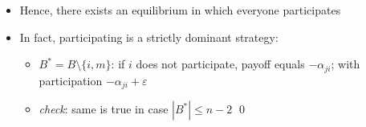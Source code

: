 \documentclass[11pt,english]{beamer}
\newcommand{\ve}{\varepsilon}
\begin{document}
\begin{frame}[allowframebreaks]
\begin{itemize}
\item Hence, there exists an equilibrium in which everyone participates\\
\label{sec-3-1-15}%
\item In fact, participating is a strictly dominant strategy:
\label{sec-3-1-16}%
\begin{itemize}

\item $B^{*}=B \setminus \{i,m\}$: if $i$ does not participate, payoff equals $-\alpha_{ji}$; with participation $-\alpha_{ji}+\ve$\\
\label{sec-3-1-16-1}%
\item \emph{check}: same is true in case $|B^{*}| \leq n-2$ \qed\\
\label{sec-3-1-16-2}%
\end{itemize} %
\end{itemize} %
\end{frame}
\end{document}
